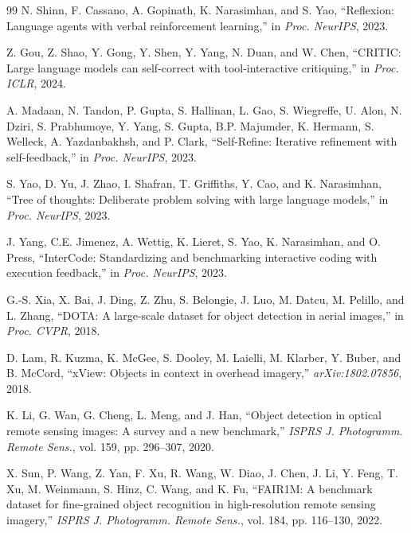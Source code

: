 \documentclass[journal]{IEEEtran}
\begin{document}
\begin{thebibliography}{99}
N. Shinn, F. Cassano, A. Gopinath, K. Narasimhan, and S. Yao, ``Reflexion: Language agents with verbal reinforcement learning,'' in \textit{Proc. NeurIPS}, 2023.

Z. Gou, Z. Shao, Y. Gong, Y. Shen, Y. Yang, N. Duan, and W. Chen, ``CRITIC: Large language models can self-correct with tool-interactive critiquing,'' in \textit{Proc. ICLR}, 2024.

A. Madaan, N. Tandon, P. Gupta, S. Hallinan, L. Gao, S. Wiegreffe, U. Alon, N. Dziri, S. Prabhumoye, Y. Yang, S. Gupta, B.P. Majumder, K. Hermann, S. Welleck, A. Yazdanbakhsh, and P. Clark, ``Self-Refine: Iterative refinement with self-feedback,'' in \textit{Proc. NeurIPS}, 2023.

S. Yao, D. Yu, J. Zhao, I. Shafran, T. Griffiths, Y. Cao, and K. Narasimhan, ``Tree of thoughts: Deliberate problem solving with large language models,'' in \textit{Proc. NeurIPS}, 2023.

J. Yang, C.E. Jimenez, A. Wettig, K. Lieret, S. Yao, K. Narasimhan, and O. Press, ``InterCode: Standardizing and benchmarking interactive coding with execution feedback,'' in \textit{Proc. NeurIPS}, 2023.

G.-S. Xia, X. Bai, J. Ding, Z. Zhu, S. Belongie, J. Luo, M. Datcu, M. Pelillo, and L. Zhang, ``DOTA: A large-scale dataset for object detection in aerial images,'' in \textit{Proc. CVPR}, 2018.

D. Lam, R. Kuzma, K. McGee, S. Dooley, M. Laielli, M. Klarber, Y. Buber, and B. McCord, ``xView: Objects in context in overhead imagery,'' \textit{arXiv:1802.07856}, 2018.

K. Li, G. Wan, G. Cheng, L. Meng, and J. Han, ``Object detection in optical remote sensing images: A survey and a new benchmark,'' \textit{ISPRS J. Photogramm. Remote Sens.}, vol. 159, pp. 296--307, 2020.

X. Sun, P. Wang, Z. Yan, F. Xu, R. Wang, W. Diao, J. Chen, J. Li, Y. Feng, T. Xu, M. Weinmann, S. Hinz, C. Wang, and K. Fu, ``FAIR1M: A benchmark dataset for fine-grained object recognition in high-resolution remote sensing imagery,'' \textit{ISPRS J. Photogramm. Remote Sens.}, vol. 184, pp. 116--130, 2022.

\end{thebibliography}
\end{document}
